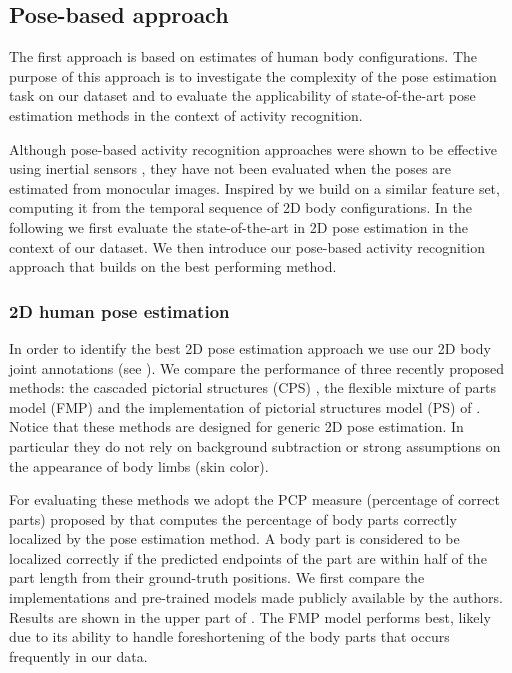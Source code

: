 \subsection{Pose-based approach}
\label{sec:cvpr12:approach:pose}



The first approach 
is based on estimates of 
human body configurations. The purpose of this approach is to investigate the
complexity of the pose estimation task on our dataset and  to evaluate the
applicability of state-of-the-art pose estimation methods in the context of
activity recognition.

Although pose-based activity recognition approaches were shown to be
effective using inertial sensors
\citep{zinnen09iswc}, they have not been evaluated when the poses
are estimated from monocular images. Inspired by \citet{zinnen09iswc} we build on
a similar feature set, computing it from the temporal sequence of 2D body configurations.
In the following we first evaluate the state-of-the-art in 2D pose estimation in
the context of our dataset. We then introduce our pose-based activity
recognition approach that builds on the best performing method.




\subsubsection{2D human pose estimation}
In order to identify the best 2D pose estimation approach 
we use our 2D body joint annotations (see ). 
We compare the performance of three recently proposed
 methods: the cascaded pictorial structures (CPS)
\citep{Sapp10cascadedmodels}, the flexible mixture of parts model (FMP)
\citep{confcvprYangR11} and the implementation of pictorial structures model (PS)
of \citet{Andriluka:2009}. Notice that these methods are designed for
generic 2D pose estimation. In particular they do not rely on  background
subtraction or strong assumptions on the appearance of body limbs (\eg skin
color). %

For evaluating these methods we adopt the PCP measure (percentage of correct parts) proposed by \citet{Ferrari:2008:PSS} that computes the percentage of body parts correctly
localized by the pose estimation method. A body part is considered to be
localized correctly if the predicted endpoints of the part are within half of
the part length from their ground-truth positions. We first compare the implementations and pre-trained models made publicly available by
the authors. Results are shown in the upper part of . The FMP
model performs best, likely due to its ability to handle foreshortening of the
body parts that occurs frequently in our data. 




